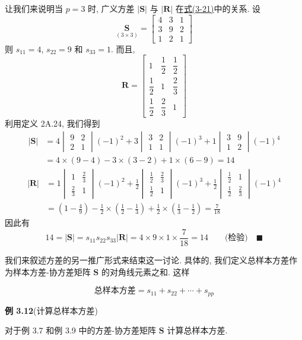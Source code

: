 让我们来说明当 $p=3$ 时, 广义方差 $|\mathbf{S}|$ 与 $|\mathbf{R}|$ 在\hyperref[eq:3-21]{式(3-21)}中的关系. 设
\[
\underset{(3\times3)}{\mathbf{S}}=\begin{bmatrix}4&3&1\\3&9&2\\1&2&1\end{bmatrix}
\]
则 $s_{11}=4$, $s_{22}=9$ 和 $s_{33}=1$. 而且,
\[
\mathbf{R}=\begin{bmatrix}1&\dfrac{1}{2}&\dfrac{1}{2}\\[4pt]\dfrac{1}{2}&1&\dfrac{2}{3}\\[4pt]\dfrac{1}{2}&\dfrac{2}{3}&1\end{bmatrix}
\]
利用定义 2A.24, 我们得到
\begin{align*}
|\mathbf{S}|&=4\begin{vmatrix}9&2\\2&1\end{vmatrix}(-1)^{2}+3\begin{vmatrix}3&2\\1&1\end{vmatrix}(-1)^{3}+1\begin{vmatrix}3&9\\1&2\end{vmatrix}(-1)^{4}\\
&=4\times(9-4)-3\times(3-2)+1\times(6-9)=14
\end{align*}
\begin{align*}
|\mathbf{R}|&=1\begin{vmatrix}1&\frac{2}{3}\\\frac{2}{3}&1\end{vmatrix}(-1)^{2}+\frac{1}{2}\begin{vmatrix}\frac{1}{2}&\frac{2}{3}\\\frac{1}{2}&1\end{vmatrix}(-1)^{3}+\frac{1}{2}\begin{vmatrix}\frac{1}{2}&1\\\frac{1}{2}&\frac{2}{3}\end{vmatrix}(-1)^{4}\\
&=\left(1-\frac{4}{9}\right)-\frac{1}{2}\times\left(\frac{1}{2}-\frac{1}{3}\right)+\frac{1}{2}\times\left(\frac{1}{3}-\frac{1}{2}\right)=\frac{7}{18}
\end{align*}
因此有
\[
14=|\mathbf{S}|=s_{11}s_{22}s_{33}|\mathbf{R}|=4\times9\times1\times\frac{7}{18}=14\qquad\text{(检验)}\quad\blacksquare
\]


我们来叙述方差的另一推广形式来结束这一讨论. 具体的, 我们定义总样本方差作为样本方差-协方差矩阵 $\mathbf{S}$ 的对角线元素之和. 这样

\begin{mvbox}
\label{eq:3-23}
\begin{equation}
\text{总样本方差}=s_{11}+s_{22}+\cdots+s_{pp} \tag{3-23}
\end{equation}
\end{mvbox}

\noindent\textbf{例 3.12}\quad (计算总样本方差)

对于例 3.7 和例 3.9 中的方差-协方差矩阵 $\mathbf{S}$ 计算总样本方差.
